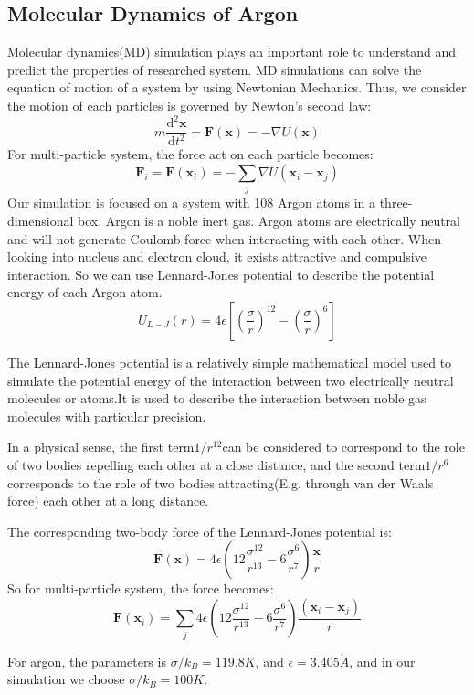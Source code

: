 \documentclass[a4paper,12pt]{article} %
\begin{document}
\subsection{Molecular Dynamics of Argon}
Molecular dynamics(MD) simulation\cite{braun2019best} plays an important role to understand and predict the properties of researched system. MD simulations can solve the equation of motion of a system by using Newtonian Mechanics. Thus, we consider the motion of each particles is governed by Newton's second law:
\begin{equation}\label{motion}
    m\frac{\mathrm{d}^{2} \boldsymbol{x}}{\mathrm{d} t^{2}} = \boldsymbol{F}(\boldsymbol{x}) = -\nabla U(\boldsymbol{x})
\end{equation}
For multi-particle system, the force act on each particle becomes:
\begin{equation}
    \boldsymbol{F}_i = \boldsymbol{F}(\boldsymbol{x}_i) = -\sum_{j} \nabla U(\boldsymbol{x}_i - \boldsymbol{x}_j)
\end{equation}
Our simulation is focused on a system with 108 Argon atoms in a three-dimensional box. Argon is a noble inert gas. Argon atoms are electrically neutral and will not generate Coulomb force when interacting with each other. When looking into nucleus and electron cloud, it exists attractive and compulsive interaction. So we can use Lennard-Jones potential\cite{jones1924determination}\cite{jones1924determination2} to describe the potential energy of each Argon atom. 
\begin{equation}\label{LJPot}
    U_{L-J}(r) = 4\epsilon \left[ \left(\frac{\sigma}{r}\right)^{12} - \left(\frac{\sigma}{r}\right)^{6}\right]
\end{equation}\par
The Lennard-Jones potential is a relatively simple mathematical model used to simulate the potential energy of the interaction between two electrically neutral molecules or atoms.It is used to describe the interaction between noble gas molecules with particular precision.\par
In a physical sense, the first term$1/r^{12}$can be considered to correspond to the role of two bodies repelling each other at a close distance, and the second term$1/r^6$ corresponds to the role of two bodies attracting(E.g. through van der Waals force) each other at a long distance.\par
The corresponding two-body force of the Lennard-Jones potential is:
\begin{equation}
    \boldsymbol{F}(\boldsymbol{x}) = 4\epsilon(12\frac{\sigma^{12}}{r^{13}}-6\frac{\sigma^6}{r^7})\frac{\boldsymbol{x}}{r}
\end{equation}
So for multi-particle system, the force becomes:
\begin{equation}
    \boldsymbol{F}(\boldsymbol{x}_i) =\sum_{j} 4\epsilon(12\frac{\sigma^{12}}{r^{13}}-6\frac{\sigma^6}{r^7})\frac{(\boldsymbol{x}_i-\boldsymbol{x}_j)}{r}
\end{equation}\par
For argon, the parameters is $\sigma/k_B = 119.8K$, and $\epsilon = 3.405 \mathring{A}$, and in our simulation we choose $\sigma/k_B = 100K$.\par
\end{document}
